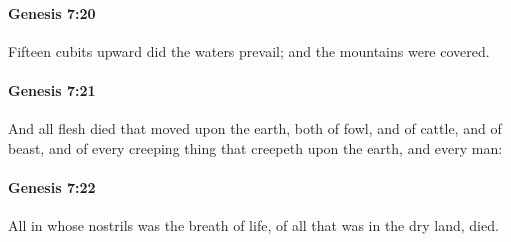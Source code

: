 		\paragraph{Genesis 7:20} %
			\label{GENESIS-7-20}

			Fifteen cubits upward did the waters prevail; and the mountains were covered.


		\paragraph{Genesis 7:21} %
			\label{GENESIS-7-21}

			And all flesh died that moved upon the earth, both of fowl, and of cattle, and of beast, and of every creeping thing that creepeth upon the earth, and every man:


		\paragraph{Genesis 7:22} %
			\label{GENESIS-7-22}

			All in whose nostrils was the breath of life, of all that was in the dry land, died.


